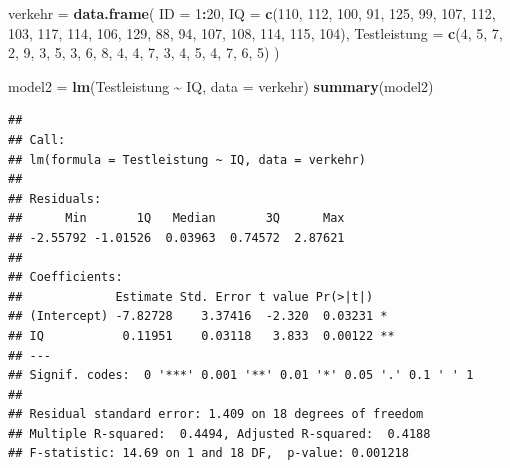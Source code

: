 \documentclass[
]{book}
\newenvironment{Shaded}{\begin{snugshade}}{\end{snugshade}}
\newcommand{\AttributeTok}[1]{\textcolor[rgb]{0.13,0.29,0.53}{#1}}
\newcommand{\DecValTok}[1]{\textcolor[rgb]{0.00,0.00,0.81}{#1}}
\newcommand{\FunctionTok}[1]{\textcolor[rgb]{0.13,0.29,0.53}{\textbf{#1}}}
\newcommand{\NormalTok}[1]{#1}
\newcommand{\OtherTok}[1]{\textcolor[rgb]{0.56,0.35,0.01}{#1}}
\newcommand{\SpecialCharTok}[1]{\textcolor[rgb]{0.81,0.36,0.00}{\textbf{#1}}}
\begin{document}
\begin{Shaded}
\begin{Highlighting}[]
\NormalTok{verkehr }\OtherTok{=} \FunctionTok{data.frame}\NormalTok{(}
  \AttributeTok{ID =} \DecValTok{1}\SpecialCharTok{:}\DecValTok{20}\NormalTok{,}
  \AttributeTok{IQ =} \FunctionTok{c}\NormalTok{(}\DecValTok{110}\NormalTok{, }\DecValTok{112}\NormalTok{, }\DecValTok{100}\NormalTok{, }\DecValTok{91}\NormalTok{, }\DecValTok{125}\NormalTok{, }\DecValTok{99}\NormalTok{, }\DecValTok{107}\NormalTok{, }\DecValTok{112}\NormalTok{, }\DecValTok{103}\NormalTok{, }\DecValTok{117}\NormalTok{,}
         \DecValTok{114}\NormalTok{, }\DecValTok{106}\NormalTok{, }\DecValTok{129}\NormalTok{, }\DecValTok{88}\NormalTok{, }\DecValTok{94}\NormalTok{, }\DecValTok{107}\NormalTok{, }\DecValTok{108}\NormalTok{, }\DecValTok{114}\NormalTok{, }\DecValTok{115}\NormalTok{, }\DecValTok{104}\NormalTok{),}
  \AttributeTok{Testleistung =} \FunctionTok{c}\NormalTok{(}\DecValTok{4}\NormalTok{, }\DecValTok{5}\NormalTok{, }\DecValTok{7}\NormalTok{, }\DecValTok{2}\NormalTok{, }\DecValTok{9}\NormalTok{, }\DecValTok{3}\NormalTok{, }\DecValTok{5}\NormalTok{, }\DecValTok{3}\NormalTok{, }\DecValTok{6}\NormalTok{, }\DecValTok{8}\NormalTok{,}
                   \DecValTok{4}\NormalTok{, }\DecValTok{4}\NormalTok{, }\DecValTok{7}\NormalTok{, }\DecValTok{3}\NormalTok{, }\DecValTok{4}\NormalTok{, }\DecValTok{5}\NormalTok{, }\DecValTok{4}\NormalTok{, }\DecValTok{7}\NormalTok{, }\DecValTok{6}\NormalTok{, }\DecValTok{5}\NormalTok{)}
\NormalTok{)}

\NormalTok{model2 }\OtherTok{=} \FunctionTok{lm}\NormalTok{(Testleistung }\SpecialCharTok{\textasciitilde{}}\NormalTok{ IQ, }\AttributeTok{data =}\NormalTok{ verkehr)}
\FunctionTok{summary}\NormalTok{(model2)}
\end{Highlighting}
\end{Shaded}

\begin{verbatim}
## 
## Call:
## lm(formula = Testleistung ~ IQ, data = verkehr)
## 
## Residuals:
##      Min       1Q   Median       3Q      Max 
## -2.55792 -1.01526  0.03963  0.74572  2.87621 
## 
## Coefficients:
##             Estimate Std. Error t value Pr(>|t|)   
## (Intercept) -7.82728    3.37416  -2.320  0.03231 * 
## IQ           0.11951    0.03118   3.833  0.00122 **
## ---
## Signif. codes:  0 '***' 0.001 '**' 0.01 '*' 0.05 '.' 0.1 ' ' 1
## 
## Residual standard error: 1.409 on 18 degrees of freedom
## Multiple R-squared:  0.4494, Adjusted R-squared:  0.4188 
## F-statistic: 14.69 on 1 and 18 DF,  p-value: 0.001218
\end{verbatim}
\end{document}
